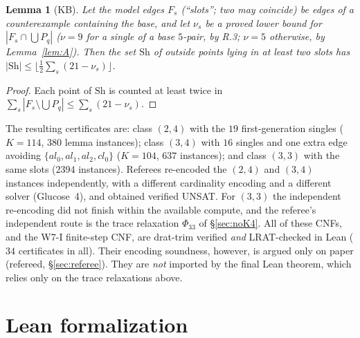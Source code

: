 \documentclass[11pt]{amsart}
\newtheorem{lemma}[theorem]{Lemma}
\theoremstyle{definition}
\begin{document}
\begin{lemma}[KB]
Let the model edges $F_s$ (``slots''; two may coincide) be edges of a counterexample containing the base, and let $\nu_s$ be a proved lower bound for $|F_s\cap\bigcup P_q|$ ($\nu=9$ for a single of a base $5$-pair, by R.3; $\nu=5$ otherwise, by Lemma~\ref{lem:A}). Then the set $\mathrm{Sh}$ of outside points lying in at least two slots has $|\mathrm{Sh}|\le\lfloor\frac12\sum_s(21-\nu_s)\rfloor$.
\end{lemma}
\begin{proof}
Each point of $\mathrm{Sh}$ is counted at least twice in $\sum_s|F_s\setminus\bigcup P_q|\le\sum_s(21-\nu_s)$.
\end{proof}

The resulting certificates are: class $(2,4)$ with the $19$ first-generation singles ($K=114$, $380$ lemma instances); class $(3,4)$ with $16$ singles and one extra edge avoiding $\{al_0,al_1,al_2,cl_0\}$ ($K=104$, $637$ instances); and class $(3,3)$ with the same slots ($2394$ instances). Referees re-encoded the $(2,4)$ and $(3,4)$ instances independently, with a different cardinality encoding and a different solver (Glucose~4), and obtained verified UNSAT. For $(3,3)$ the independent re-encoding did not finish within the available compute, and the referee's independent route is the trace relaxation $\Phi_{33}$ of \S\ref{sec:noK4}. All of these CNFs, and the W7-I finite-step CNF, are drat-trim verified \emph{and} LRAT-checked in Lean ($34$ certificates in all). Their encoding soundness, however, is argued only on paper (refereed, \S\ref{sec:referee}). They are \emph{not} imported by the final Lean theorem, which relies only on the trace relaxations above.

\section{Lean formalization}\label{sec:lean}
\end{document}
